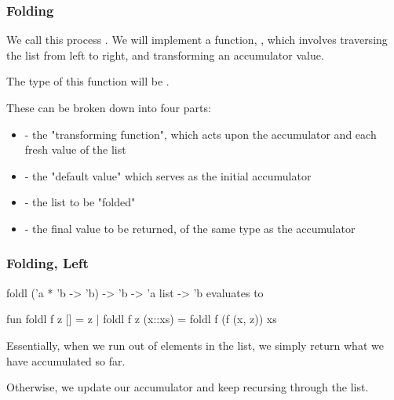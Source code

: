 \documentclass[aspectratio=169, handout]{beamer}
\begin{document}
\begin{frame}[fragile]
  \frametitle{Folding}

  We call this process . We will implement a function, , which
  involves traversing the list from left to right, and transforming an accumulator
  value.

  \pause
  \vspace{\fill}

  The type of this function will be .

  \pause
  \vspace{\fill}

  These can be broken down into four parts:
  \pause
  \begin{itemize}
    \item {} - the "transforming function", which acts upon the 
    accumulator and each fresh value of the list \pause
    \item {} - the "default value" which serves as the initial accumulator \pause
    \item {} - the list to be "folded" \pause
    \item {} - the final value to be returned, of the same type as the accumulator
  \end{itemize}
\end{frame}

\begin{frame}[fragile]
  \frametitle{Folding, Left}

  \spec
    {foldl}
    {('a * 'b -> 'b) -> 'b -> 'a list -> 'b}
    {}
    { evaluates to }

  \pause
  \begin{codeblock}
    fun foldl f z [] = z
      | foldl f z (x::xs) = foldl f (f (x, z)) xs  
  \end{codeblock}

  \pause
  \vspace{\fill}

  Essentially, when we run out of elements in the list, we simply return
  what we have accumulated so far.

  \pause
  \vspace{\fill}

  Otherwise, we update our accumulator and keep recursing through the list. 
\end{frame}
\end{document}
